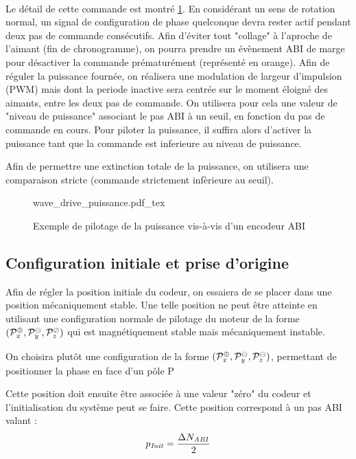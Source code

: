 \paragraph{}
Le détail de cette commande est montré \cref{fig-wave_drive_wrt_abi}. 
En considérant un sens de rotation normal, un signal de configuration de phase quelconque devra rester actif pendant deux pas de commande consécutifs.
Afin d'éviter tout "collage" à l'aproche de l'aimant (fin de chronogramme), on pourra prendre un évènement ABI de marge pour désactiver la commande prématurément (représenté en orange).
Afin de réguler la puissance fournée, on réalisera une modulation de largeur d'impulsion (PWM) mais dont la periode inactive sera centrée sur le moment éloigné des aimants, entre les deux pas de commande.
On utilisera pour cela une valeur de "niveau de puissance" associant le pas ABI à un seuil, en fonction du pas de commande en cours.
Pour piloter la puissance, il suffira alors d'activer la puissance tant que la commande est inferieure au niveau de puissance.

Afin de permettre une extinction totale de la puissance, on utilisera une comparaison stricte (commande strictement infèrieure au seuil).

\begin{figure}[h]
    \centering
    \def\svgwidth{17cm}
    \small
    {wave_drive_puissance.pdf_tex}
    \caption{Exemple de pilotage de la puissance vis-à-vis d'un encodeur ABI}
    \label{fig-wave_drive_wrt_abi}
\end{figure}


\subsection{Configuration initiale et prise d'origine}
Afin de régler la position initiale du codeur, on essaiera de se placer dans une position mécaniquement stable.
Une telle position ne peut être atteinte en utilisant une configuration normale de pilotage du moteur de la forme $(\mathcal{P}_\mathit{x}^{\oplus},\mathcal{P}_\mathit{y}^{\ominus},\mathcal{P}_\mathit{z}^{\oslash})$ qui est magnétiquement stable mais mécaniquement instable.

On choisira plutôt une configuration de la forme $(\mathcal{P}_\mathit{x}^{\oplus},\mathcal{P}_\mathit{y}^{\ominus},\mathcal{P}_\mathit{z}^{\ominus})$, permettant de positionner la phase  en face d'un pôle P

Cette position doit ensuite être associée à une valeur "zéro" du codeur et l'initialisation du système peut se faire.
Cette position correspond à un pas ABI \initabipos valant :
$$p_{\mathit{Init}} = \frac{\Delta N_\mathit{ABI}}{2}$$
